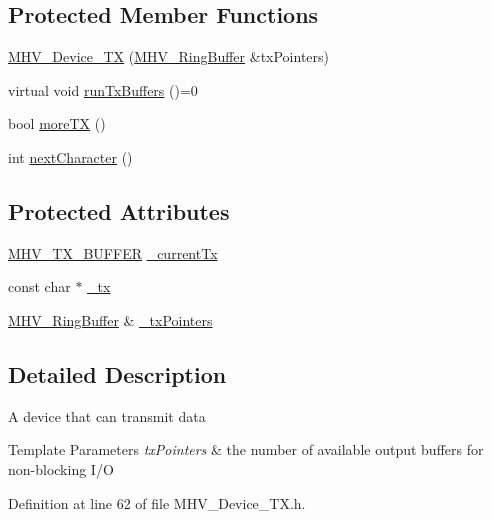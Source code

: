 \subsection*{Protected Member Functions}
\begin{DoxyCompactItemize}
\item 
\hyperlink{class_m_h_v___device___t_x_a71cca6bdbc5f56f9ca161abe4d46e888}{M\-H\-V\-\_\-\-Device\-\_\-\-T\-X} (\hyperlink{class_m_h_v___ring_buffer}{M\-H\-V\-\_\-\-Ring\-Buffer} \&tx\-Pointers)
\item 
virtual void \hyperlink{class_m_h_v___device___t_x_a3a86067d417c3d5a1f64042ecfcefff7}{run\-Tx\-Buffers} ()=0
\item 
bool \hyperlink{class_m_h_v___device___t_x_a64cba701f06476b494a97620e1a26e86}{more\-T\-X} ()
\item 
int \hyperlink{class_m_h_v___device___t_x_a9e9f436d2b41766db5225c504af96ef5}{next\-Character} ()
\end{DoxyCompactItemize}
\subsection*{Protected Attributes}
\begin{DoxyCompactItemize}
\item 
\hyperlink{_m_h_v___device___t_x_8h_a8f969362e45e1a805a4a189101bd1f97}{M\-H\-V\-\_\-\-T\-X\-\_\-\-B\-U\-F\-F\-E\-R} \hyperlink{class_m_h_v___device___t_x_af2764653ba9f0b2a59bbca39f3987a74}{\-\_\-current\-Tx}
\item 
const char $\ast$ \hyperlink{class_m_h_v___device___t_x_ace8827a700dcc1a6a54e0bf80906085c}{\-\_\-tx}
\item 
\hyperlink{class_m_h_v___ring_buffer}{M\-H\-V\-\_\-\-Ring\-Buffer} \& \hyperlink{class_m_h_v___device___t_x_a36768491def5fdb4936e918c0ea097cd}{\-\_\-tx\-Pointers}
\end{DoxyCompactItemize}


\subsection{Detailed Description}
A device that can transmit data 
\begin{DoxyTemplParams}{Template Parameters}
{\em tx\-Pointers} & the number of available output buffers for non-\/blocking I/\-O \\
\hline
\end{DoxyTemplParams}


Definition at line 62 of file M\-H\-V\-\_\-\-Device\-\_\-\-T\-X.\-h.




